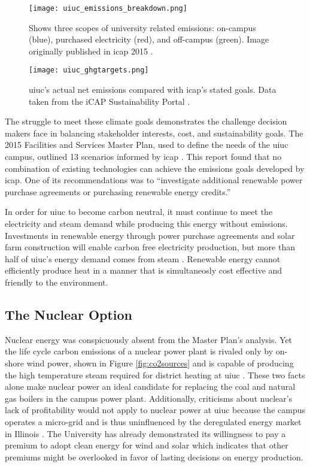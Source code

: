 \begin{figure}[h]
  \centering
  \texttt{[image: uiuc\_emissions\_breakdown.png]}
  \caption{Shows three scopes of university related emissions: on-campus
  (blue), purchased electricity (red), and off-campus (green). Image originally
  published in \gls{icap} 2015 \cite{isee_illinois_2015}.}
  \label{fig:uiuc_emissions_breakdown}
\end{figure}

\begin{figure}[h]
  \centering
  \texttt{[image: uiuc\_ghgtargets.png]}
  \caption{\gls{uiuc}'s actual net emissions compared with \gls{icap}'s
  stated goals. Data taken from the iCAP Sustainability Portal
  \cite{noauthor_metric_nodate}.}
  \label{fig:uiuc_ghg}
\end{figure}

The struggle to meet these climate goals demonstrates the challenge decision
makers face in balancing stakeholder interests, cost, and sustainability goals.
The 2015 Facilities and Services Master Plan, used to define the needs of the
\gls{uiuc} campus, outlined 13 scenarios informed by \gls{icap}
\cite{affiliated_engineers_inc_utilities_2015}. This report found that no
combination of existing technologies can achieve the emissions goals developed
by \gls{icap}. One of its recommendations was to ``investigate additional
renewable power purchase agreements or purchasing renewable energy credits.''

In order for \gls{uiuc} to become carbon neutral, it must continue to meet the
electricity and steam demand while producing this energy without emissions.
Investments in renewable energy through power purchase agreements and solar
farm construction will enable carbon free electricity production, but more than
half of \gls{uiuc}'s energy demand comes from steam \cite{isee_illinois_2015}
. Renewable energy cannot
efficiently produce heat in a manner that is simultaneosly cost effective and
friendly to the environment.

\subsection{The Nuclear Option}
Nuclear energy was conspicuously absent from the Master Plan's analysis. Yet
the life cycle carbon emissions of a nuclear power plant is rivaled only by on-
shore wind power, shown in Figure \ref{fig:co2sources} and is capable of
producing the high temperature steam required for district heating at
\gls{uiuc} \cite{allen_framing_2018}. These two facts alone make nuclear power
an ideal candidate for replacing the coal and natural gas boilers in the campus
power plant. Additionally, criticisms about nuclear's lack of profitability
would not apply to nuclear power at \gls{uiuc} because the campus operates a
micro-grid and is thus uninfluenced by the deregulated energy market in
Illinois \cite{clemmer_nuclear_2018, nian_economic_2020}. The University has
already demonstrated its willingness to pay a premium to adopt clean energy for
wind and solar
\cite{breitweiser_wind_2016,white_solar_2017,noauthor_solar_nodate} which
indicates that other premiums might be overlooked in favor of lasting decisions
on energy production.

